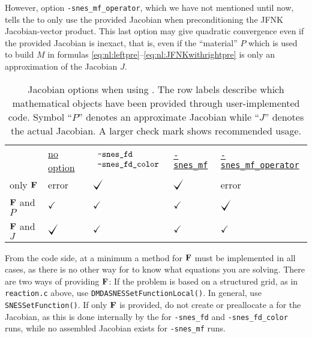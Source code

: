 However, option \texttt{-snes\_mf\_operator}, which we have not mentioned until now, tells the \pSNES to only use the provided Jacobian when preconditioning the JFNK Jacobian-vector product.  This last option may give quadratic convergence even if the provided Jacobian is inexact, that is, even if the ``material'' $P$ which is used to build $M$ in formulas \eqref{eq:nl:leftpre}--\eqref{eq:nl:JFNKwithrightpre} is only an approximation of the Jacobian $J$.

\begin{table}
\begin{tabular}{lllll}
 &\underline{\small no option}\hspace{0.0in} & \underline{\small\hspace{-0.05in}$\begin{array}{ll} \text{\texttt{-snes\_fd}} \\ \text{\texttt{-snes\_fd\_color}}\end{array}$} & \underline{\small \texttt{-snes\_mf}} & \underline{\small \texttt{-snes\_mf\_operator}} \\
only $\mathbf{F}$      & error           & $\bigcheckmark$ & $\bigcheckmark$ & error \\
$\mathbf{F}$ and $P$   & $\checkmark$ & $\checkmark$    & $\checkmark$    & $\bigcheckmark$ \\
$\mathbf{F}$ and $J$   & $\bigcheckmark$ & $\checkmark$    & $\checkmark$    & $\checkmark$
\end{tabular}
\caption{Jacobian options when using \pSNES.  The row labels describe which mathematical objects have been provided through user-implemented code.  Symbol ``$P$'' denotes an approximate Jacobian while ``$J$'' denotes the actual Jacobian.  A larger check mark shows recommended usage.} \label{tab:snesjacobianoptions:needed}
\end{table}

From the code side, at a minimum a method for $\mathbf{F}$ must be implemented in all cases, as there is no other way for \PETSc to know what equations you are solving.   There are two ways of providing $\mathbf{F}$:  If the problem is based on a structured grid, as in \texttt{reaction.c} above, use \texttt{DMDASNESSetFunctionLocal()}.  In general, use \texttt{SNESSetFunction()}.  If only $\mathbf{F}$ is provided, do not create or preallocate a \pMat for the Jacobian, as this is done internally by the \pSNES for \texttt{-snes\_fd} and \texttt{-snes\_fd\_color} runs, while no assembled Jacobian \pMat exists for \texttt{-snes\_mf} runs.

